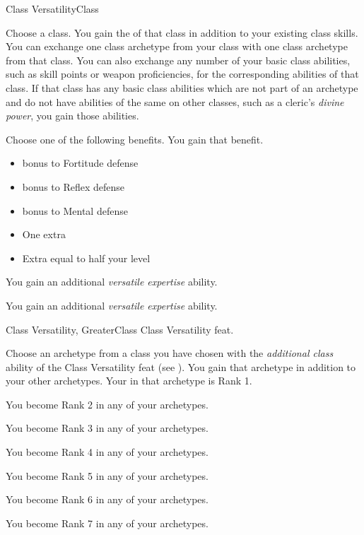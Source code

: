     \begin{feat}{Class Versatility}{Class}

         Choose a class.
        You gain the  of that class in addition to your existing class skills.
        You can exchange one class archetype from your class with one class archetype from that class.
        You can also exchange any number of your basic class abilities, such as skill points or weapon proficiencies, for the corresponding abilities of that class.
        If that class has any basic class abilities which are not part of an archetype and do not have abilities of the same on other classes, such as a cleric's \textit{divine power}, you gain those abilities.

         Choose one of the following benefits.
        You gain that benefit.
        \begin{itemize}
            \item {} bonus to Fortitude defense
            \item {} bonus to Reflex defense
            \item {} bonus to Mental defense
            \item One extra 
            \item Extra  equal to half your level
        \end{itemize}

         You gain an additional \textit{versatile expertise} ability.

         You gain an additional \textit{versatile expertise} ability.
    \end{feat}

    \begin{feat}{Class Versatility, Greater}{Class}
        \featpre Class Versatility feat.

         Choose an archetype from a class you have chosen with the \textit{additional class} ability of the Class Versatility feat (see ).
        You gain that archetype in addition to your other archetypes.
        Your  in that archetype is Rank 1.

         You become Rank 2 in any of your archetypes.

         You become Rank 3 in any of your archetypes.

         You become Rank 4 in any of your archetypes.

         You become Rank 5 in any of your archetypes.

         You become Rank 6 in any of your archetypes.

         You become Rank 7 in any of your archetypes.
    \end{feat}

